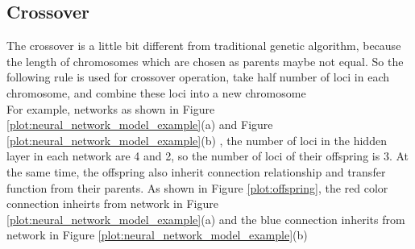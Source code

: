 \documentclass[smallextended]{svjour3}       %
\begin{document}
\begin{multicols}{2}
\subsection{Crossover}
  The crossover is a little bit different from traditional genetic algorithm,
because the length of chromosomes which are chosen as parents maybe  not
equal.  So the following rule is used for crossover operation,  take 
half number of loci in each chromosome, and combine these loci into a new
chromosome \\
  For example, networks as shown in Figure
\ref{plot:neural_network_model_example}(a) and
Figure \ref{plot:neural_network_model_example}(b) , the number of loci in the
hidden layer in each network are 4 and 2, so the number of loci of their
offspring is 3. At the same time, the offspring also inherit connection
relationship and transfer function from their parents. As shown in Figure
\ref{plot:offspring}, the red color connection inheirts from network in Figure
\ref{plot:neural_network_model_example}(a) and the blue connection inherits from
network in Figure \ref{plot:neural_network_model_example}(b)\\ 

\begin{center}
\end{center}
\end{multicols}
\end{document}
